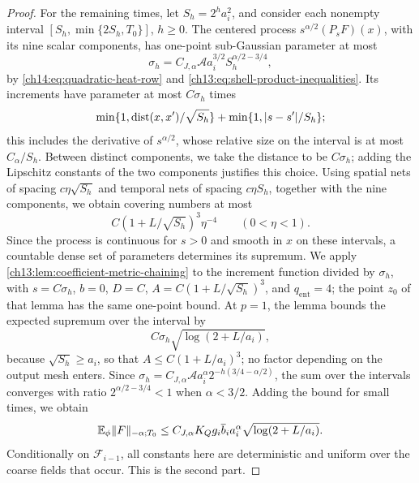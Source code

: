 \begin{proof}
For the remaining times, let $S_h=2^ha_i^2$, and consider each nonempty interval $[S_h,\min\{2S_h,T_0\}]$, $h\ge0$. The centered process $s^{\alpha/2}(P_sF)(x)$, with its nine scalar components, has one-point sub-Gaussian parameter at most
\[
 \sigma_h=C_{J,\alpha}\mathcal Aa_i^{3/2}S_h^{\alpha/2-3/4},
\]
by \eqref{ch14:eq:quadratic-heat-row} and \eqref{ch13:eq:shell-product-inequalities}. Its increments have parameter at most $C\sigma_h$ times
\[
 \min\{1,\operatorname{dist}(x,x')/\sqrt{S_h}\}+\min\{1,\lvert s-s'\rvert/S_h\};
\]
this includes the derivative of $s^{\alpha/2}$, whose relative size on the interval is at most $C_\alpha/S_h$. Between distinct components, we take the distance to be $C\sigma_h$; adding the Lipschitz constants of the two components justifies this choice. Using spatial nets of spacing $c\eta\sqrt{S_h}$ and temporal nets of spacing $c\eta S_h$, together with the nine components, we obtain covering numbers at most
\[
 C(1+L/\sqrt{S_h})^3\eta^{-4}\qquad(0<\eta<1).
\]
Since the process is continuous for $s>0$ and smooth in $x$ on these intervals, a countable dense set of parameters determines its supremum. We apply \cref{ch13:lem:coefficient-metric-chaining} to the increment function divided by $\sigma_h$, with $s=C\sigma_h$, $b=0$, $D=C$, $A=C(1+L/\sqrt{S_h})^3$, and $q_{\mathrm{ent}}=4$; the point $z_0$ of that lemma has the same one-point bound. At $p=1$, the lemma bounds the expected supremum over the interval by
\[
 C\sigma_h\sqrt{\log(2+L/a_i)},
\]
because $\sqrt{S_h}\ge a_i$, so that $A\le C(1+L/a_i)^3$; no factor depending on the output mesh enters. Since $\sigma_h=C_{J,\alpha}\mathcal Aa_i^\alpha2^{-h(3/4-\alpha/2)}$, the sum over the intervals converges with ratio $2^{\alpha/2-3/4}<1$ when $\alpha<3/2$. Adding the bound for small times, we obtain
\[
 \mathbb E_\phi\lVert F\rVert_{-\alpha;T_0}\le C_{J,\alpha}K_Qg_i\overline b_ia_i^\alpha\sqrt{\log(2+L/a_i)}.
\]
Conditionally on $\mathcal F_{i-1}$, all constants here are deterministic and uniform over the coarse fields that occur. This is the second part.


\end{proof}
